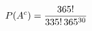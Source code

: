 \documentclass[preview]{standalone}
\begin{document}
\begin{align*}
\special{dvisvgm:raw <g id='unique000'>}P(A^c)=\frac{365!}{335!\,365^{30}}\special{dvisvgm:raw </g>}
\end{align*}
\end{document}
